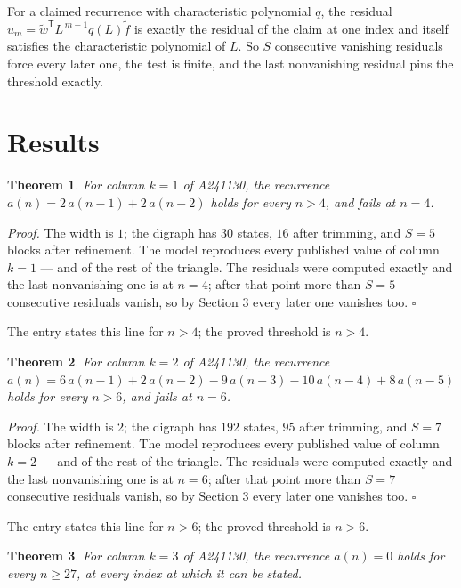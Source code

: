 \documentclass[11pt]{article}
\newtheorem{theorem}{Theorem}
\theoremstyle{definition}
\begin{document}
For a claimed recurrence with characteristic polynomial $q$, the residual $u_m = \tilde w^{\mathsf T}L^{\,m-1}q(L)\tilde f$ is exactly the residual of the claim at one index and itself satisfies the characteristic polynomial of $L$. So $S$ consecutive vanishing residuals force every later one, the test is finite, and the last nonvanishing residual pins the threshold exactly.

\section{Results}

\begin{theorem} For column $k = 1$ of A241130, the recurrence $a(n) = 2\,a(n-1) + 2\,a(n-2)$ holds for every $n > 4$, and fails at $n = 4$.\end{theorem}

{\itshape Proof.} The width is $1$; the digraph has $30$ states, $16$ after trimming, and $S = 5$ blocks after refinement. The model reproduces every published value of column $k = 1$ --- and of the rest of the triangle. The residuals were computed exactly and the last nonvanishing one is at $n = 4$; after that point more than $S = 5$ consecutive residuals vanish, so by Section 3 every later one vanishes too. $\square$

The entry states this line for $n > 4$; the proved threshold is $n > 4$.

\begin{theorem} For column $k = 2$ of A241130, the recurrence $a(n) = 6\,a(n-1) + 2\,a(n-2) - 9\,a(n-3) - 10\,a(n-4) + 8\,a(n-5)$ holds for every $n > 6$, and fails at $n = 6$.\end{theorem}

{\itshape Proof.} The width is $2$; the digraph has $192$ states, $95$ after trimming, and $S = 7$ blocks after refinement. The model reproduces every published value of column $k = 2$ --- and of the rest of the triangle. The residuals were computed exactly and the last nonvanishing one is at $n = 6$; after that point more than $S = 7$ consecutive residuals vanish, so by Section 3 every later one vanishes too. $\square$

The entry states this line for $n > 6$; the proved threshold is $n > 6$.

\begin{theorem} For column $k = 3$ of A241130, the recurrence $a(n) = 0$ holds for every $n \ge 27$, at every index at which it can be stated.\end{theorem}
\end{document}
